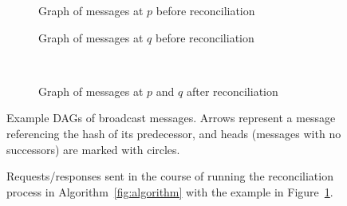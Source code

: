 \documentclass[a4paper,anonymous,USenglish]{lipics-v2019}
\begin{document}
\begin{figure}[p]
    \centering
    \begin{subfigure}{0.45\textwidth}
    
    \caption{Graph of messages at $p$ before reconciliation}
    \end{subfigure}\hfill
    \begin{subfigure}{0.45\textwidth}
    
    \caption{Graph of messages at $q$ before reconciliation}
    \end{subfigure}\\[10pt]
    \begin{subfigure}{0.4\textwidth}
    
    \caption{Graph of messages at $p$ and $q$ after reconciliation}
    \end{subfigure}
    \caption{Example DAGs of broadcast messages. Arrows represent a message referencing the hash of its predecessor, and heads (messages with no successors) are marked with circles.}
    \label{fig:example-dags}
\end{figure}

\begin{figure}[p]
    
    \caption{Requests/responses sent in the course of running the reconciliation process in Algorithm~\ref{fig:algorithm} with the example in Figure~\ref{fig:example-dags}.}
    \label{fig:messages}
\end{figure}
\end{document}
